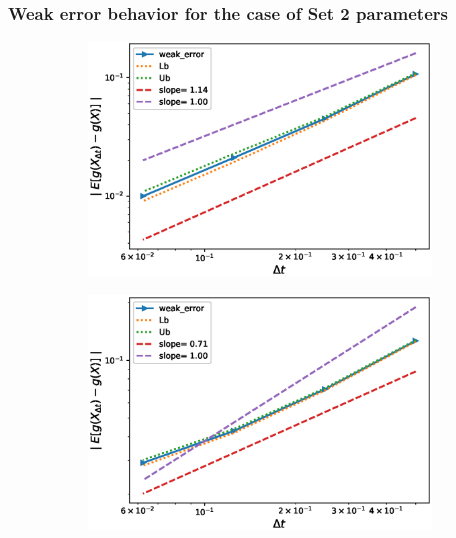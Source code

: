 \subsubsection*{Weak error behavior for the case of Set 2 parameters}


\FloatBarrier
\begin{figure}[htb]
	\centering %
	\begin{subfigure}{0.4\textwidth}
		\includegraphics[width=\linewidth]{./figures/Heston_single_call_smooth_vol/weak_convergence/weak_convergence_order_single_call_option_heston_relative_M_2_10_6_beta_512_smooth_scheme_set2}
		\caption{}
		\label{fig:1}
	\end{subfigure}\hfil %
	\begin{subfigure}{0.4\textwidth}
		\includegraphics[width=\linewidth]{./figures/Heston_single_call_ABR_moment_matching/weak_convergence/weak_convergence_order_single_call_option_heston_relative_M_1_10_7_beta_128_ABR_set2}

\end{subfigure}
\end{figure}
